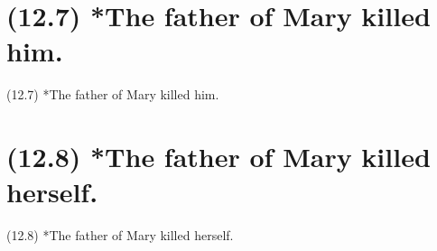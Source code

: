 \documentclass{article}
\begin{document}
\clearpage

%
%

\section*{(12.7) *The father of Mary killed him.}

\bigbreak
\begin{enumerate*}
\item[(12.7)] *The father of Mary killed him.
\end{enumerate*}
\bigbreak

\bigbreak
\begin{minipage}{\textwidth}
\end{minipage}
\bigbreak

\clearpage

%
%

\section*{(12.8) *The father of Mary killed herself.}

\bigbreak
\begin{enumerate*}
\item[(12.8)] *The father of Mary killed herself.
\end{enumerate*}
\bigbreak

\bigbreak
\begin{minipage}{\textwidth}
\end{minipage}
\bigbreak
\end{document}
